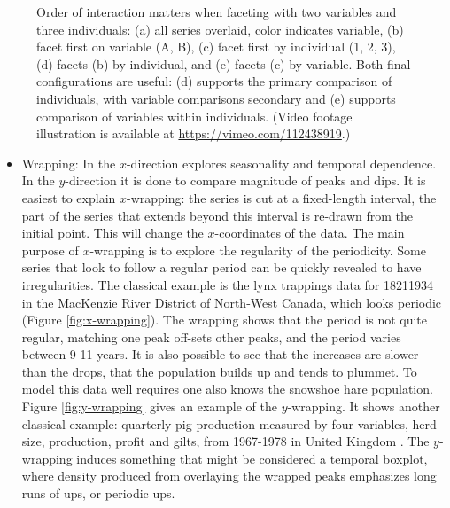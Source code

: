 \documentclass[12pt]{article}
\begin{document}
\begin{center}
\begin{figure}[htp]
\caption{\label{fig:faceting-var-ind}Order of interaction matters when faceting with two variables and three individuals: (a) all series overlaid, color indicates variable, (b) facet first on variable (A, B),  (c) facet first by individual (1, 2, 3), (d) facets (b) by individual, and (e) facets (c) by variable. Both final configurations are useful: (d) supports the primary comparison of individuals, with variable comparisons secondary and (e) supports comparison of variables within individuals.  (Video footage illustration is available at \url{https://vimeo.com/112438919}.)}
\end{figure}

\end{center}



\begin{itemize} \itemsep 0in
\item Wrapping: In the $x$-direction explores seasonality and
  temporal dependence.  In the $y$-direction it is done to compare
  magnitude of peaks and dips. It is easiest to explain $x$-wrapping:
  the series is cut at a fixed-length interval, the part of the series
  that extends beyond this interval is re-drawn from the initial
  point. This will change the $x$-coordinates of the data. The main
  purpose of $x$-wrapping is to explore the regularity of the
  periodicity. Some series that look to follow a regular period can be
  quickly revealed to have irregularities. The classical example is
  the lynx trappings data for 1821\textendash{}1934 in the MacKenzie
  River District of North-West Canada\citep{campbell1977survey}, which
  looks periodic (Figure \ref{fig:x-wrapping}). The wrapping shows
  that the period is not quite regular, matching one peak off-sets
  other peaks, and the period varies between 9-11 years. It is also
  possible to see that the increases are slower than the drops, that
  the population builds up and tends to plummet. To model this data
  well requires one also knows the snowshoe hare population. Figure
  \ref{fig:y-wrapping} gives an example of the $y$-wrapping. It
  shows another classical example: quarterly pig production measured
  by four variables, herd size, production, profit and gilts, from
  1967-1978 in United Kingdom \citep{andrews1985data}. The $y$-wrapping
  induces something that might be considered a temporal boxplot, where
  density produced from overlaying the wrapped peaks emphasizes long
  runs of ups, or periodic ups.

\end{itemize}
\end{document}
